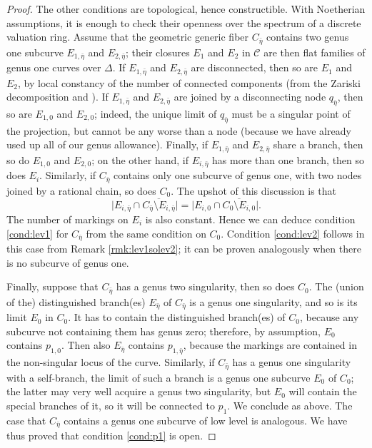 \documentclass[11pt]{amsart}
\newcommand{\dvr}{\Delta}
\theoremstyle{plain}
\theoremstyle{definition}
\begin{document}
\begin{proof}
 The other conditions are topological, hence constructible. With Noetherian assumptions, it is enough to check their openness over the spectrum of a discrete valuation ring. Assume that the geometric generic fiber $C_{\bar\eta}$ contains two genus one subcurve $E_{1,\bar\eta}$ and $E_{2,\bar\eta}$; their closures $E_1$ and $E_2$ in $\mathcal C$ are then flat families of genus one curves over $\dvr$. If $E_{1,\bar\eta}$ and $E_{2,\bar\eta}$ are disconnected, then so are $E_1$ and $E_2$, by local constancy of the number of connected components (from the Zariski decomposition and \cite[\href{https://stacks.math.columbia.edu/tag/0E0D}{Tag 0E0D}]{stacks-project}). If $E_{1,\bar\eta}$ and $E_{2,\bar\eta}$ are joined by a disconnecting node $q_{\bar\eta}$, then so are $E_{1,0}$ and $E_{2,0}$; indeed, the unique limit of $q_{\bar\eta}$ must be a singular point of the projection, but cannot be any worse than a node (because we have already used up all of our genus allowance). Finally, if $E_{1,\bar\eta}$ and $E_{2,\bar\eta}$ share a branch, then so do $E_{1,0}$ and $E_{2,0}$; on the other hand, if $E_{i,\bar\eta}$ has more than one branch, then so does $E_i$. Similarly, if $C_{\bar\eta}$ contains only one subcurve of genus one, with two nodes joined by a rational chain, so does $C_0$. The upshot of this discussion is that
 \[\lvert E_{i,\bar\eta}\cap\overline{C_{\bar\eta}\setminus E_{i,\bar\eta}}\rvert=\lvert E_{i,0}\cap\overline{C_{0}\setminus E_{i,0}}\rvert.\]
 The number of markings on $E_i$ is also constant. Hence we can deduce condition \eqref{cond:lev1} for $C_{\bar\eta}$ from the same condition on $C_0$. Condition \eqref{cond:lev2} follows in this case from Remark \ref{rmk:lev1solev2}; it can be proven analogously when there is no subcurve of genus one.
 
 Finally, suppose that $C_{\bar\eta}$ has a genus two singularity, then so does $C_0$. The (union of the) distinguished branch(es) $E_{\bar\eta}$ of $C_{\bar\eta}$ is a genus one singularity, and so is its limit $E_0$ in $C_0$. It has to contain the distinguished branch(es) of $C_0$, because any subcurve not containing them has genus zero; therefore, by assumption, $E_0$ contains $p_{1,0}$. Then also $E_{\bar\eta}$ contains $p_{1,\bar\eta}$, because the markings are contained in the non-singular locus of the curve. Similarly, if $C_{\bar\eta}$ has a genus one singularity with a self-branch, the limit of such a branch is a genus one subcurve $E_0$ of $C_0$; the latter may very well acquire a genus two singularity, but $E_0$ will contain the special branches of it, so it will be connected to $p_1$. We conclude as above. The case that $C_{\bar\eta}$ contains a genus one subcurve of low level is analogous. We have thus proved that condition \eqref{cond:p1} is open.
\end{proof}
\end{document}
